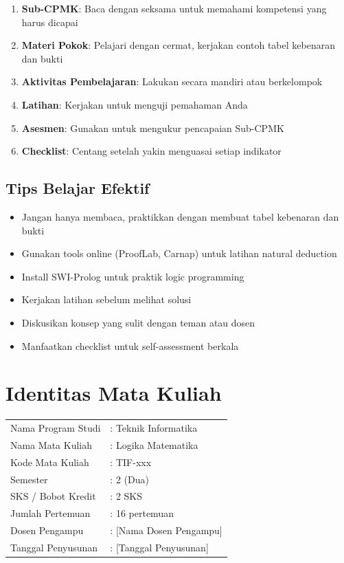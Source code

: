 \begin{enumerate}
  \item \textbf{Sub-CPMK}: Baca dengan seksama untuk memahami kompetensi yang harus dicapai
  \item \textbf{Materi Pokok}: Pelajari dengan cermat, kerjakan contoh tabel kebenaran dan bukti
  \item \textbf{Aktivitas Pembelajaran}: Lakukan secara mandiri atau berkelompok
  \item \textbf{Latihan}: Kerjakan untuk menguji pemahaman Anda
  \item \textbf{Asesmen}: Gunakan untuk mengukur pencapaian Sub-CPMK
  \item \textbf{Checklist}: Centang setelah yakin menguasai setiap indikator
\end{enumerate}

\section*{Tips Belajar Efektif}

\begin{itemize}
  \item Jangan hanya membaca, praktikkan dengan membuat tabel kebenaran dan bukti
  \item Gunakan tools online (ProofLab, Carnap) untuk latihan natural deduction
  \item Install SWI-Prolog untuk praktik logic programming
  \item Kerjakan latihan sebelum melihat solusi
  \item Diskusikan konsep yang sulit dengan teman atau dosen
  \item Manfaatkan checklist untuk self-assessment berkala
\end{itemize}

\cleardoublepage

\chapter*{Identitas Mata Kuliah}

\begin{tabular}{ll}
  Nama Program Studi & : Teknik Informatika \\
  Nama Mata Kuliah & : Logika Matematika \\
  Kode Mata Kuliah & : TIF-xxx \\
  Semester & : 2 (Dua) \\
  SKS / Bobot Kredit & : 2 SKS \\
  Jumlah Pertemuan & : 16 pertemuan \\
  Dosen Pengampu & : [Nama Dosen Pengampu] \\
  Tanggal Penyusunan & : [Tanggal Penyusunan] \\
\end{tabular}

